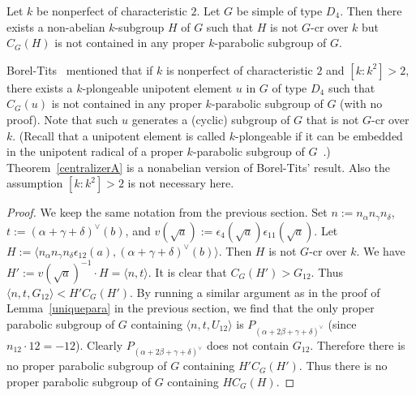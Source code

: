\begin{thm}\label{centralizerA}
Let $k$ be nonperfect of characteristic $2$. Let $G$ be simple of type $D_4$. Then there exists a non-abelian $k$-subgroup $H$ of $G$ such that $H$ is not $G$-cr over $k$ but $C_G(H)$ is not contained in any proper $k$-parabolic subgroup of $G$. 
\end{thm}
\begin{rem}
Borel-Tits~\cite[Rem.~2.8]{Borel-Tits-unipotent-invent} mentioned that if $k$ is nonperfect of characteristic $2$ and $[k:k^2]>2$, there exists a $k$-plongeable unipotent element $u$ in $G$ of type $D_4$ such that $C_G(u)$ is not contained in any proper $k$-parabolic subgroup of $G$ (with no proof). Note that such $u$ generates a (cyclic) subgroup of $G$ that is not $G$-cr over $k$. (Recall that a unipotent element is called $k$-plongeable if it can be embedded in the unipotent radical of a proper $k$-parabolic subgroup of $G$~\cite{Borel-Tits-unipotent-invent}.) Theorem~\ref{centralizerA} is a nonabelian version of Borel-Tits' result. Also the assumption $[k:k^2]>2$ is not necessary here. 
\end{rem}
\begin{proof}
We keep the same notation from the previous section. Set $n:=n_\alpha n_\gamma n_\delta$,  $t:=(\alpha+\gamma+\delta)^{\vee}(b)$, and $v(\sqrt a):=\epsilon_4(\sqrt a)\epsilon_{11}(\sqrt a)$. Let $H:=\langle n_\alpha n_\gamma n_\delta \epsilon_{12}(a), (\alpha+\gamma+\delta)^{\vee}(b) \rangle$.  Then $H$ is not $G$-cr over $k$. 
We have $H':=v(\sqrt a)^{-1}\cdot H = \langle n, t \rangle$. It is clear that $C_G(H')>G_{12}$. Thus $\langle n, t, G_{12} \rangle < H'C_G(H')$. By running a similar argument as in the proof of Lemma~\ref{uniquepara} in the previous section, we find that the only proper parabolic subgroup of $G$ containing $\langle n, t, U_{12} \rangle$ is $P_{(\alpha+2\beta+\gamma+\delta)^{\vee}}$ (since $n_{12}\cdot 12 = -12$). Clearly $P_{(\alpha+2\beta+\gamma+\delta)^{\vee}}$ does not contain $G_{12}$. Therefore there is no proper parabolic subgroup of $G$ containing $H'C_G(H')$. Thus there is no proper parabolic subgroup of $G$ containing $HC_G(H)$. 
\end{proof}



